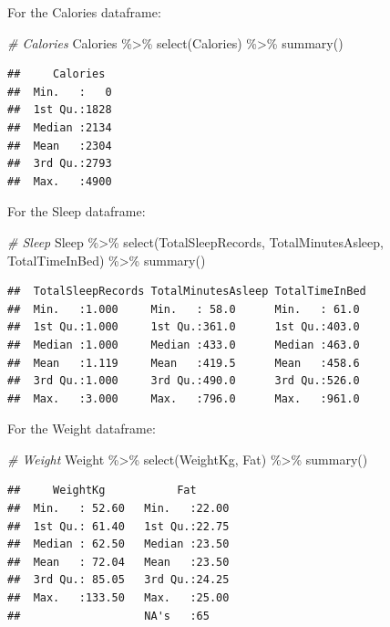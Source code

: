 \documentclass[
]{article}
\newenvironment{Shaded}{\begin{snugshade}}{\end{snugshade}}
\newcommand{\CommentTok}[1]{\textcolor[rgb]{0.56,0.35,0.01}{\textit{#1}}}
\newcommand{\FunctionTok}[1]{\textcolor[rgb]{0.00,0.00,0.00}{#1}}
\newcommand{\NormalTok}[1]{#1}
\newcommand{\SpecialCharTok}[1]{\textcolor[rgb]{0.00,0.00,0.00}{#1}}
\begin{document}
For the Calories dataframe:

\begin{Shaded}
\begin{Highlighting}[]
\CommentTok{\# Calories}
\NormalTok{Calories }\SpecialCharTok{\%\textgreater{}\%}
  \FunctionTok{select}\NormalTok{(Calories) }\SpecialCharTok{\%\textgreater{}\%}
  \FunctionTok{summary}\NormalTok{()}
\end{Highlighting}
\end{Shaded}

\begin{verbatim}
##     Calories   
##  Min.   :   0  
##  1st Qu.:1828  
##  Median :2134  
##  Mean   :2304  
##  3rd Qu.:2793  
##  Max.   :4900
\end{verbatim}

For the Sleep dataframe:

\begin{Shaded}
\begin{Highlighting}[]
\CommentTok{\# Sleep}
\NormalTok{Sleep }\SpecialCharTok{\%\textgreater{}\%}
  \FunctionTok{select}\NormalTok{(TotalSleepRecords, TotalMinutesAsleep, TotalTimeInBed) }\SpecialCharTok{\%\textgreater{}\%}
  \FunctionTok{summary}\NormalTok{()}
\end{Highlighting}
\end{Shaded}

\begin{verbatim}
##  TotalSleepRecords TotalMinutesAsleep TotalTimeInBed 
##  Min.   :1.000     Min.   : 58.0      Min.   : 61.0  
##  1st Qu.:1.000     1st Qu.:361.0      1st Qu.:403.0  
##  Median :1.000     Median :433.0      Median :463.0  
##  Mean   :1.119     Mean   :419.5      Mean   :458.6  
##  3rd Qu.:1.000     3rd Qu.:490.0      3rd Qu.:526.0  
##  Max.   :3.000     Max.   :796.0      Max.   :961.0
\end{verbatim}

For the Weight dataframe:

\begin{Shaded}
\begin{Highlighting}[]
\CommentTok{\# Weight}
\NormalTok{Weight }\SpecialCharTok{\%\textgreater{}\%}
  \FunctionTok{select}\NormalTok{(WeightKg, Fat) }\SpecialCharTok{\%\textgreater{}\%}
  \FunctionTok{summary}\NormalTok{()}
\end{Highlighting}
\end{Shaded}

\begin{verbatim}
##     WeightKg           Fat       
##  Min.   : 52.60   Min.   :22.00  
##  1st Qu.: 61.40   1st Qu.:22.75  
##  Median : 62.50   Median :23.50  
##  Mean   : 72.04   Mean   :23.50  
##  3rd Qu.: 85.05   3rd Qu.:24.25  
##  Max.   :133.50   Max.   :25.00  
##                   NA's   :65
\end{verbatim}
\end{document}
